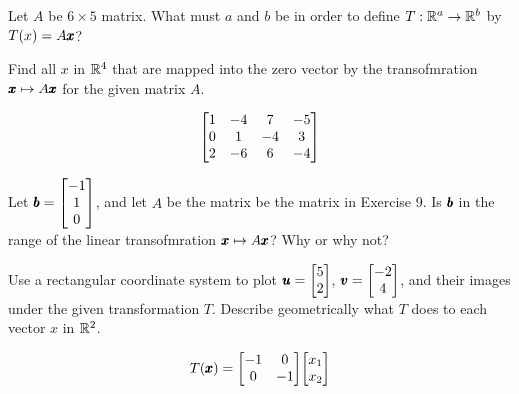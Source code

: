 \documentclass{../mathhomework}
\newenvironment{Mat}{\begin{bmatrix}}{\end{bmatrix}}
\begin{document}
\begin{problem}[1.8\#7]
    Let $A$ be $6 \times 5$ matrix. What must $a$ and $b$ be in order to define $T: \mathbb{R}^a \to \mathbb{R}^b$ by $T(x) = A\pmb{x}$?
\end{problem}

\begin{problem}[1.8\#9]
    Find all $x$ in $\mathbb{R}^4$ that are mapped into the zero vector by the transofmration $\pmb{x} \mapsto A\pmb{x}$ for the given matrix $A$.
    
    \begin{equation*}
        \begin{Mat}
            1 & -4 & 7 & -5 \\
            0 & 1 & -4 & 3 \\
            2 & -6 & 6 & -4
        \end{Mat}
    \end{equation*}
\end{problem}

\begin{problem}[1.8\#11]
    Let $\Vect{b} = \begin{Mat}
        -1 \\ 1 \\ 0
    \end{Mat}$, and let $A$ be the matrix be the matrix in Exercise 9. Is $\pmb{b}$ in the range of the linear transofmration $\pmb{x} \mapsto A\pmb{x}$? Why or why not?
\end{problem}

\begin{problem}[1.8\#13]
    Use a rectangular coordinate system to plot $\Vect{u} = \begin{Mat}
        5 \\ 2
    \end{Mat}$, $\Vect{v} = \begin{Mat}
        -2 \\ 4
    \end{Mat}$, and their images under the given transformation $T$. Describe geometrically what $T$ does to each vector $x$ in $\mathbb{R}^2$.

    \begin{equation*}
        T(\Vect{x}) = \begin{Mat}
            -1 & 0 \\
            0 & -1
        \end{Mat}
        \begin{Mat}
            x_1 \\ x_2
        \end{Mat}
    \end{equation*}
\end{problem}
\end{document}
